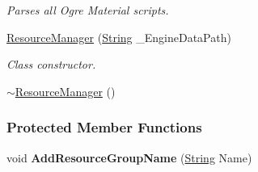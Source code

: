 \begin{DoxyCompactItemize}
\begin{DoxyCompactList}\small\item\em Parses all Ogre Material scripts. \item\end{DoxyCompactList}\item 
\hyperlink{classMezzanine_1_1ResourceManager_a39de49ab83e338cb14057e599c4db499}{ResourceManager} (\hyperlink{namespaceMezzanine_acf9fcc130e6ebf08e3d8491aebcf1c86}{String} \_\-EngineDataPath)
\begin{DoxyCompactList}\small\item\em Class constructor. \item\end{DoxyCompactList}\item 
\hyperlink{classMezzanine_1_1ResourceManager_a10cfccc0ecb1322995c170f2756460ea}{$\sim$ResourceManager} ()
\end{DoxyCompactItemize}
\subsubsection*{Protected Member Functions}
\begin{DoxyCompactItemize}
\item 
\hypertarget{classMezzanine_1_1ResourceManager_ab5d5f9eeaf17337556bc833d8befae19}{
void {\bfseries AddResourceGroupName} (\hyperlink{namespaceMezzanine_acf9fcc130e6ebf08e3d8491aebcf1c86}{String} Name)}
\label{classMezzanine_1_1ResourceManager_ab5d5f9eeaf17337556bc833d8befae19}

\end{DoxyCompactItemize}

